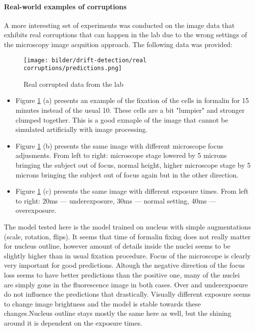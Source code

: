 \paragraph{Real-world examples of corruptions}
A more interesting set of experiments was conducted on the image data that exhibits real corruptions that can happen in the lab due to the wrong settings of the microscopy image acquition approach. The following data was provided: 
\begin{figure}[htb]
	\begin{center}
		\texttt{[image: bilder/drift-detection/real corruptions/predictions.png]}
		\caption{Real corrupted data from the lab}\label{fig:real-corruptions-predictions}
	\end{center}
\end{figure}


\begin{itemize}
    \item Figure \ref{fig:real-corruptions-predictions} (a) presents an example of the fixation of the cells in formalin for 15 minutes instead of the usual 10. These cells are a bit "lumpier" and stronger clumped together. This is a good exmaple of the image that cannot be simulated artificially with image processing.
    
    \item Figure \ref{fig:real-corruptions-predictions} (b) presents the same image with different microscope focus adjusments. From left to right: microscope stage lowered by 5 microns bringing the subject out of focus, normal height, higher microscope stage by 5 microns bringing the subject out of focus again but in the other direction.
    
    \item Figure \ref{fig:real-corruptions-predictions} (c) presents the same image with different exposure times. From left to right: 20ms --- underexposure, 30ms --- normal setting, 40ms --- overexposure.
\end{itemize}

The model tested here is the model trained on nucleus with simple augmentations (scale, rotation, flips). It seems that time of formalin fixing does not really matter for nucleus outline, however amount of details inside the nuclei seems to be slightly higher than in usual fixation procedure. Focus of the microscope is clearly very important for good predictions. Altough the negative direction of the focus loss seems to have better predictions than the positive one, many of the nuclei are simply gone in the fluorescence image in both cases. Over and underexposure do not influence the predictions that drastically. Visually different exposure seems to change image brightness and the model is stable towards these changes.Nucleus outline stays mostly the same here as well, but the shining around it is dependent on the exposure times.